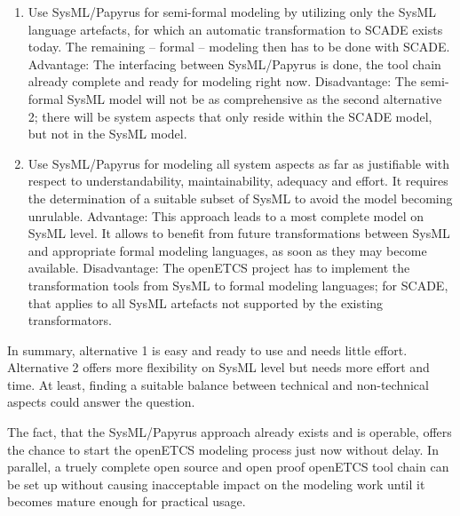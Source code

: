 \begin{enumerate}
	\item Use SysML/Papyrus for semi-formal modeling by utilizing only the SysML language artefacts, for which an automatic transformation to SCADE exists today. The remaining – formal – modeling then has to be done with SCADE. 
Advantage: The interfacing between SysML/Papyrus is done, the tool chain already complete and ready for modeling right now.
Disadvantage: The semi-formal SysML model will not be as comprehensive as the second alternative 2; there will be system aspects that only reside within the SCADE model, but not in the SysML model.
	\item Use SysML/Papyrus for modeling all system aspects as far as justifiable with respect to understandability, maintainability, adequacy and effort. It requires the determination of a suitable subset of SysML to avoid the model becoming unrulable. 
Advantage: This approach leads to a most complete model on SysML level. It allows to benefit from future transformations between SysML and appropriate formal modeling languages, as soon as they may become available. 
Disadvantage: The openETCS project has to implement the transformation tools from SysML to formal modeling languages; for SCADE, that applies to all SysML artefacts not supported by the existing transformators.
\end{enumerate}

In summary, alternative 1 is easy and ready to use and needs little effort. Alternative 2 offers more flexibility on SysML level but needs more effort and time. 
At least, finding a suitable balance between technical and non-technical aspects could answer the question.  

The fact, that the SysML/Papyrus approach already exists and is operable, offers the chance to start the openETCS modeling process just now without delay. 
In parallel, a truely complete open source and open proof openETCS tool chain can be set up without causing inacceptable impact on the modeling work until it becomes mature enough for practical usage. 

